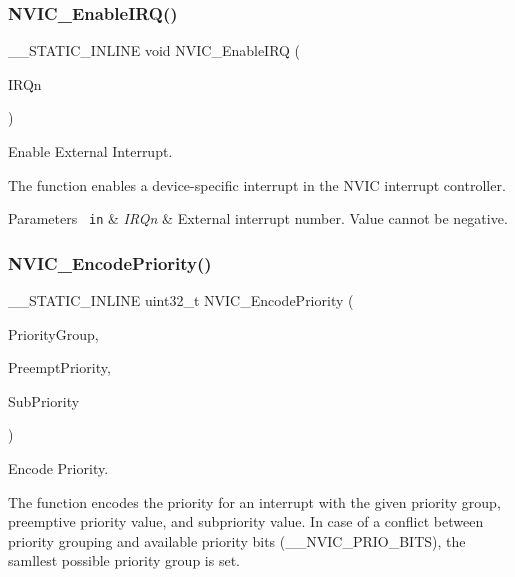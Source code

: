 \subsubsection{\texorpdfstring{NVIC\_EnableIRQ()}{NVIC\_EnableIRQ()}}
{\footnotesize\ttfamily \+\_\+\+\_\+\+S\+T\+A\+T\+I\+C\+\_\+\+I\+N\+L\+I\+NE void N\+V\+I\+C\+\_\+\+Enable\+I\+RQ (\begin{DoxyParamCaption}\item[{\mbox{\hyperlink{group___configuration__section__for___c_m_s_i_s_gac3af4a32370fb28c4ade8bf2add80251}{I\+R\+Qn\+\_\+\+Type}}}]{I\+R\+Qn }\end{DoxyParamCaption})}



Enable External Interrupt. 

The function enables a device-\/specific interrupt in the N\+V\+IC interrupt controller.


\begin{DoxyParams}[1]{Parameters}
\mbox{\texttt{ in}}  & {\em I\+R\+Qn} & External interrupt number. Value cannot be negative. \\
\hline
\end{DoxyParams}
\mbox{\label{group___c_m_s_i_s___core___n_v_i_c_functions_gadb94ac5d892b376e4f3555ae0418ebac}} 
\subsubsection{\texorpdfstring{NVIC\_EncodePriority()}{NVIC\_EncodePriority()}}
{\footnotesize\ttfamily \+\_\+\+\_\+\+S\+T\+A\+T\+I\+C\+\_\+\+I\+N\+L\+I\+NE uint32\+\_\+t N\+V\+I\+C\+\_\+\+Encode\+Priority (\begin{DoxyParamCaption}\item[{uint32\+\_\+t}]{Priority\+Group,  }\item[{uint32\+\_\+t}]{Preempt\+Priority,  }\item[{uint32\+\_\+t}]{Sub\+Priority }\end{DoxyParamCaption})}



Encode Priority. 

The function encodes the priority for an interrupt with the given priority group, preemptive priority value, and subpriority value. In case of a conflict between priority grouping and available priority bits (\+\_\+\+\_\+\+N\+V\+I\+C\+\_\+\+P\+R\+I\+O\+\_\+\+B\+I\+TS), the samllest possible priority group is set.



